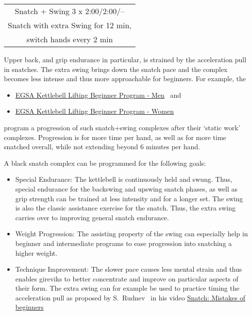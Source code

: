 \documentclass[a4paper,11pt,oneside]{article}
\begin{document}
\begin{center}
\begin{tabular}{c}
\hline
Snatch + Swing 3 x 2:00/2:00/-- \\
Snatch with extra Swing for 12 min, \\
switch hands every 2 min \\
\hline
\end{tabular}
\end{center}

Upper back, and grip endurance in particular, is strained by the acceleration pull 
in snatches. The extra swing brings down the snatch pace and the complex becomes 
less intense and thus more approachable for beginners.
For example, the 
\begin{itemize}
  \item \href{https://www.elitegirevoy.com/kettlebell-lifting-beginners-program-men/}
         {EGSA Kettlebell Lifting Beginner Program - Men}~
         \cite{egsa_kb_lifting_beginner_program_men} and
  \item \href{https://www.elitegirevoy.com/kettlebell-lifting-beginners-program-women/}
         {EGSA Kettlebell Lifting Beginner Program - Women}~
         \cite{egsa_kb_lifting_beginner_program_women}
\end{itemize}
program a progression of such snatch+swing complexes after their `static work' 
complexes. Progression is for more time per hand, as well as for more time snatched 
overall, while not extending beyond 6 minutes per hand.

A black snatch complex can be programmed for the following goals:

\begin{itemize}

  \item{Special Endurance:} The kettlebell is continuously held and swung. Thus, 
  special endurance for the backswing and upswing snatch phases, as well as grip 
  strength can be trained at less intensity and for a longer set. The swing is also 
  the classic assistance exercise for the snatch. Thus, the extra swing carries over 
  to improving general snatch endurance.
  
  \item{Weight Progression:} The assisting property of the swing can especially help 
  in beginner and intermediate programs to ease progression into snatching a higher 
  weight.
  
  \item{Technique Improvement:} The slower pace causes less mental strain and thus 
  enables gireviks to better concentrate and improve on particular aspects of their 
  form. The extra swing can for example be used to practice timing the acceleration 
  pull as proposed by S.~Rudnev~\cite{rkbyten_snatch_beginner_mistakes} in his video 
  \href{https://youtu.be/N186yUP9LcU?t=89}{Snatch: Mistakes of beginners}  

\end{itemize}
\end{document}
